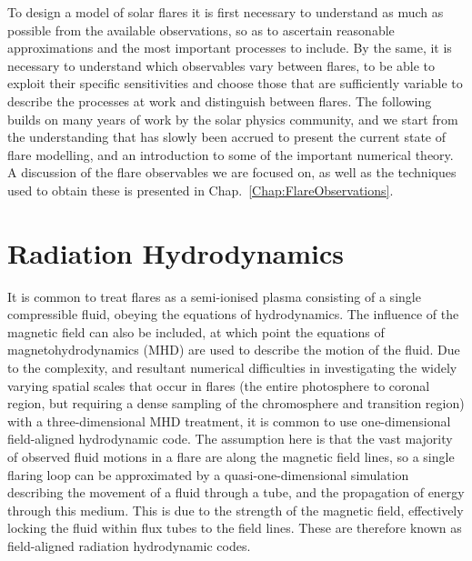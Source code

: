 To design a model of solar flares it is first necessary to understand as much as possible from the available observations, so as to ascertain reasonable approximations and the most important processes to include.
By the same, it is necessary to understand which observables vary between flares, to be able to exploit their specific sensitivities and choose those that are sufficiently variable to describe the processes at work and distinguish between flares.
The following builds on many years of work by the solar physics community, and we start from the understanding that has slowly been accrued to present the current state of flare modelling, and an introduction to some of the important numerical theory.
A discussion of the flare observables we are focused on, as well as the techniques used to obtain these is presented in Chap.~\ref{Chap:FlareObservations}.

\section{Radiation Hydrodynamics}


It is common to treat flares as a semi-ionised plasma consisting of a single compressible fluid, obeying the equations of hydrodynamics. The influence of the magnetic field can also be included, at which point the equations of magnetohydrodynamics (MHD) are used to describe the motion of the fluid.
Due to the complexity, and resultant numerical difficulties in investigating the widely varying spatial scales that occur in flares (the entire photosphere to coronal region, but requiring a dense sampling of the chromosphere and transition region) with a three-dimensional MHD treatment, it is common to use one-dimensional field-aligned hydrodynamic code.
The assumption here is that the vast majority of observed fluid motions in a flare are along the magnetic field lines, so a single flaring loop can be approximated by a quasi-one-dimensional simulation describing the movement of a fluid through a tube, and the propagation of energy through this medium.
This is due to the strength of the magnetic field, effectively locking the fluid within flux tubes to the field lines.
These are therefore known as field-aligned radiation hydrodynamic codes.

